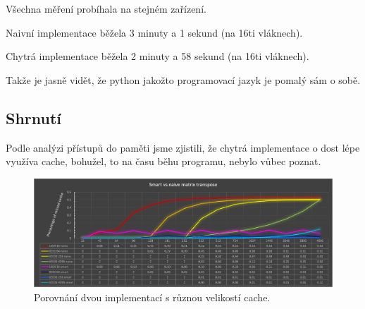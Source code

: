 \documentclass[a4paper]{article}
\begin{document}
  	Všechna měření probíhala na stejném zařízení.

	Naivní implementace běžela 3 minuty a 1 sekund (na 16ti vláknech). 

	Chytrá implementace běžela 2 minuty a 58 sekund (na 16ti vláknech). 

	Takže je jasně vidět, že python jakožto programovací jazyk je pomalý sám o sobě.
	
	\subsection{Shrnutí}

	Podle analýzi přístupů do paměti jsme zjistili, že chytrá implementace o dost
	lépe využíva cache, bohužel, to na času běhu programu, nebylo vůbec poznat.

    \begin{figure}[H]
		\centering
		\includegraphics[angle=90,width=\textwidth,height=\textheight,keepaspectratio]{img/graph1.png}
		\caption{Porovnání dvou implementací s různou velikostí cache.}
		\label{fig:1_graph}
	\end{figure}
\end{document}
